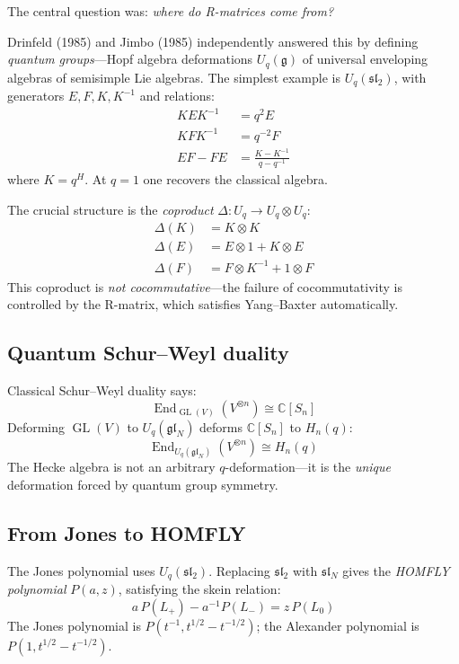 \documentclass[12pt]{article}
\DeclareMathOperator{\End}{End}
\DeclareMathOperator{\GL}{GL}
\begin{document}
The central question was: \emph{where do R-matrices come from?}

Drinfeld (1985) and Jimbo (1985) independently answered this by defining
\emph{quantum groups}---Hopf algebra deformations $U_q(\mathfrak{g})$ of
universal enveloping algebras of semisimple Lie algebras. The simplest
example is $U_q(\mathfrak{sl}_2)$, with generators $E, F, K, K^{-1}$ and
relations:
\begin{align}
  K E K^{-1} &= q^2 E \\
  K F K^{-1} &= q^{-2} F \\
  EF - FE &= \frac{K - K^{-1}}{q - q^{-1}}
\end{align}
where $K = q^H$. At $q = 1$ one recovers the classical algebra.

The crucial structure is the \emph{coproduct}
$\Delta : U_q \to U_q \otimes U_q$:
\begin{align}
  \Delta(K) &= K \otimes K \\
  \Delta(E) &= E \otimes 1 + K \otimes E \\
  \Delta(F) &= F \otimes K^{-1} + 1 \otimes F
\end{align}
This coproduct is \emph{not cocommutative}---the failure of
cocommutativity is controlled by the R-matrix, which satisfies
Yang--Baxter automatically.

\subsection{Quantum Schur--Weyl duality}

Classical Schur--Weyl duality says:
\[
  \End_{\GL(V)}(V^{\otimes n}) \cong \mathbb{C}[S_n]
\]
Deforming $\GL(V)$ to $U_q(\mathfrak{gl}_N)$ deforms $\mathbb{C}[S_n]$
to $H_n(q)$:
\[
  \End_{U_q(\mathfrak{gl}_N)}(V^{\otimes n}) \cong H_n(q)
\]
The Hecke algebra is not an arbitrary $q$-deformation---it is the
\emph{unique} deformation forced by quantum group symmetry.

\subsection{From Jones to HOMFLY}

The Jones polynomial uses $U_q(\mathfrak{sl}_2)$. Replacing
$\mathfrak{sl}_2$ with $\mathfrak{sl}_N$ gives the \emph{HOMFLY polynomial}
$P(a,z)$, satisfying the skein relation:
\[
  a \, P(L_+) - a^{-1} P(L_-) = z \, P(L_0)
\]
The Jones polynomial is $P(t^{-1}, t^{1/2} - t^{-1/2})$;
the Alexander polynomial is $P(1, t^{1/2} - t^{-1/2})$.
\end{document}
